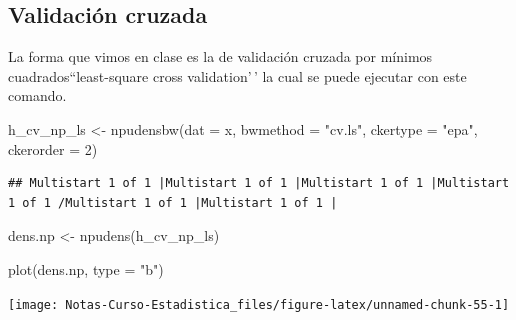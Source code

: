 \documentclass[
  12pt,
]{book}
\newenvironment{Shaded}{\begin{snugshade}}{\end{snugshade}}
\newcommand{\AttributeTok}[1]{\textcolor[rgb]{0.77,0.63,0.00}{#1}}
\newcommand{\DecValTok}[1]{\textcolor[rgb]{0.00,0.00,0.81}{#1}}
\newcommand{\FunctionTok}[1]{\textcolor[rgb]{0.00,0.00,0.00}{#1}}
\newcommand{\NormalTok}[1]{#1}
\newcommand{\OtherTok}[1]{\textcolor[rgb]{0.56,0.35,0.01}{#1}}
\newcommand{\StringTok}[1]{\textcolor[rgb]{0.31,0.60,0.02}{#1}}
\begin{document}
\hypertarget{validaciuxf3n-cruzada-1}{%
\subsection{Validación cruzada}\label{validaciuxf3n-cruzada-1}}

La forma que vimos en clase es la de validación cruzada por mínimos
cuadrados``least-square cross validation'\,' la cual se puede ejecutar
con este comando.

\begin{Shaded}
\begin{Highlighting}[]
\NormalTok{h\_cv\_np\_ls }\OtherTok{\textless{}{-}} \FunctionTok{npudensbw}\NormalTok{(}\AttributeTok{dat =}\NormalTok{ x, }\AttributeTok{bwmethod =} \StringTok{"cv.ls"}\NormalTok{,}
    \AttributeTok{ckertype =} \StringTok{"epa"}\NormalTok{, }\AttributeTok{ckerorder =} \DecValTok{2}\NormalTok{)}
\end{Highlighting}
\end{Shaded}

\begin{verbatim}
## Multistart 1 of 1 |Multistart 1 of 1 |Multistart 1 of 1 |Multistart 1 of 1 /Multistart 1 of 1 |Multistart 1 of 1 |                   
\end{verbatim}

\begin{Shaded}
\begin{Highlighting}[]
\NormalTok{dens.np }\OtherTok{\textless{}{-}} \FunctionTok{npudens}\NormalTok{(h\_cv\_np\_ls)}

\FunctionTok{plot}\NormalTok{(dens.np, }\AttributeTok{type =} \StringTok{"b"}\NormalTok{)}
\end{Highlighting}
\end{Shaded}

\begin{center}\texttt{[image: Notas-Curso-Estadistica\_files/figure-latex/unnamed-chunk-55-1]} \end{center}
\end{document}
